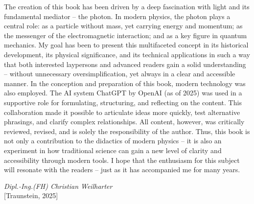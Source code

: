 The creation of this book has been driven by a deep fascination with light and its fundamental mediator – the photon. In modern physics, the photon plays a central role: as a particle without mass, yet carrying energy and momentum; as the messenger of the electromagnetic interaction; and as a key figure in quantum mechanics.  
\noindent
My goal has been to present this multifaceted concept in its historical development, its physical significance, and its technical applications in such a way that both interested laypersons and advanced readers gain a solid understanding – without unnecessary oversimplification, yet always in a clear and accessible manner.  
\noindent
In the conception and preparation of this book, modern technology was also employed. The AI system ChatGPT by OpenAI (as of 2025) was used in a supportive role for formulating, structuring, and reflecting on the content. This collaboration made it possible to articulate ideas more quickly, test alternative phrasings, and clarify complex relationships.  
All content, however, was critically reviewed, revised, and is solely the responsibility of the author.  
\noindent
Thus, this book is not only a contribution to the didactics of modern physics – it is also an experiment in how traditional science can gain a new level of clarity and accessibility through modern tools.  
\noindent
I hope that the enthusiasm for this subject will resonate with the readers – just as it has accompanied me for many years.  

\begin{flushright}
	\textit{Dipl.-Ing.(FH) Christian Weilharter} \\
	\vspace{0.5em}
	[Traunstein, 2025]
\end{flushright}

